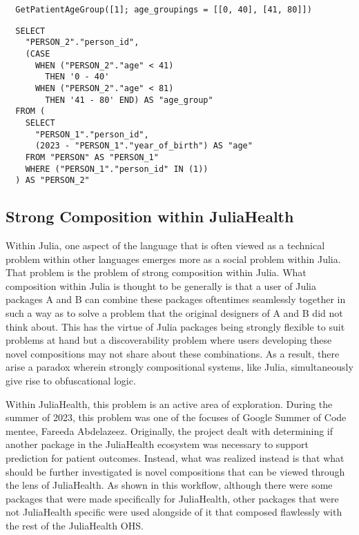 \documentclass{juliacon}
\begin{document}
\begin{verbatim}
  GetPatientAgeGroup([1]; age_groupings = [[0, 40], [41, 80]])
\end{verbatim}

\begin{verbatim}
  SELECT
    "PERSON_2"."person_id",
    (CASE 
      WHEN ("PERSON_2"."age" < 41) 
        THEN '0 - 40' 
      WHEN ("PERSON_2"."age" < 81) 
        THEN '41 - 80' END) AS "age_group"
  FROM (
    SELECT
      "PERSON_1"."person_id",
      (2023 - "PERSON_1"."year_of_birth") AS "age"
    FROM "PERSON" AS "PERSON_1"
    WHERE ("PERSON_1"."person_id" IN (1))
  ) AS "PERSON_2"
\end{verbatim}

\subsection{Strong Composition within JuliaHealth}

Within Julia, one aspect of the language that is often viewed as a technical problem within other languages emerges more as a social problem within Julia.
That problem is the problem of strong composition within Julia.
What composition within Julia is thought to be generally is that a user of Julia packages A and B can combine these packages oftentimes seamlessly together in such a way as to solve a problem that the original designers of A and B did not think about.
This has the virtue of Julia packages being strongly flexible to suit problems at hand but a discoverability problem where users developing these novel compositions may not share about these combinations.
As a result, there arise a paradox wherein strongly compositional systems, like Julia, simultaneously give rise to obfuscational logic.

Within JuliaHealth, this problem is an active area of exploration.
During the summer of 2023, this problem was one of the focuses of Google Summer of Code mentee, Fareeda Abdelazeez.
Originally, the project dealt with determining if another package in the JuliaHealth ecosystem was necessary to support prediction for patient outcomes.
Instead, what was realized instead is that what should be further investigated is novel compositions that can be viewed through the lens of JuliaHealth.
As shown in this workflow, although there were some packages that were made specifically for JuliaHealth, other packages that were not JuliaHealth specific were used alongside of it that composed flawlessly with the rest of the JuliaHealth OHS.
\end{document}
